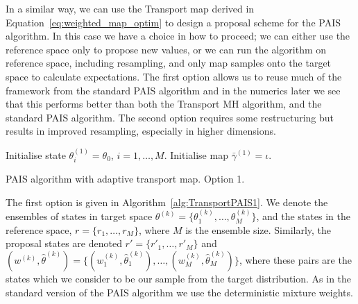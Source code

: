 \documentclass[final]{siamltex}
\begin{document}
In a similar way, we can use the Transport map derived in Equation~\eqref{eq:weighted_map_optim} to
design a proposal scheme for the PAIS algorithm. In this case we have a choice in how to proceed; we
can either use the reference space only to propose new values, or we can run the algorithm on reference space, including resampling, and only map samples onto the target space to calculate expectations. The first option allows us to reuse much of the framework
from the standard PAIS algorithm and in the numerics later we see that this performs better than
both the Transport MH algorithm, and the standard PAIS algorithm. The second option requires some
restructuring but results in improved resampling, especially in higher dimensions.

\begin{table}
\begin{algorithm}[H]
\DontPrintSemicolon
\BlankLine
Initialise state $\theta^{(1)}_i = \theta_0$, \quad $i = 1,\dots,M$.\;
Initialise map $\bar{\gamma}^{(1)} = \iota$.\;
\caption{PAIS algorithm with adaptive transport map. Option 1.\label{alg:TransportPAIS1}}
\end{algorithm}
\end{table}

The first option is given in Algorithm~\ref{alg:TransportPAIS1}. We denote the ensembles of states in target space $\theta^{(k)} = \{\theta^{(k)}_1,\dots,\theta^{(k)}_M\}$, and the states in the reference space, $r = \{r_1,\dots,r_M\}$, where $M$ is the ensemble size. Similarly, the proposal states are denoted $r' = \{r'_1,\dots,r'_M\}$ and $(w^{(k)}, \hat{\theta}^{(k)}) = \{(w^{(k)}_1, \hat{\theta}^{(k)}_1),\dots,(w^{(k)}_M, \hat{\theta}^{(k)}_M)\}$, where these pairs are the states which we consider to be our sample from the target distribution. As in the standard version of the PAIS algorithm we use the deterministic mixture weights.
\end{document}
